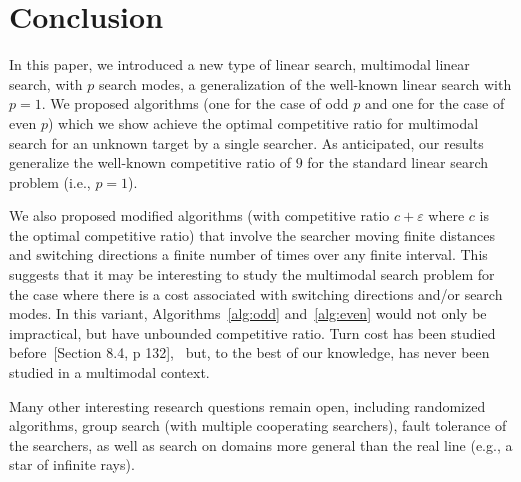 \section{Conclusion}

In this paper, we introduced a new type of linear search, multimodal linear search, with $p$ search modes, a generalization of the well-known linear search with $p=1$.
We proposed algorithms (one for the case of odd $p$ and one for the case of even $p$) which we show achieve the optimal competitive ratio for multimodal search for an unknown target by a single searcher.
As anticipated, our results generalize the well-known competitive ratio of $9$ for the standard linear search problem (i.e., $p=1$). 

We also proposed modified algorithms (with competitive ratio $c + \varepsilon$ where $c$ is the optimal competitive ratio) that involve the searcher moving finite distances and switching directions a finite number of times over any finite interval.
This suggests that it may be interesting to study the multimodal search problem for the case where there is a cost associated with switching directions and/or search modes.
In this variant, Algorithms~\ref{alg:odd} and~\ref{alg:even} would not only be impractical, but have unbounded competitive ratio.
Turn cost has been studied before~\cite{gal_search_games}[Section 8.4, p 132],~\cite{turn_cost,turn_cost_gal,lopezsearching} but, to the best of our knowledge, has never been studied in a multimodal context.

Many other interesting research questions remain open, including randomized algorithms, group search (with multiple cooperating searchers), fault tolerance of the searchers, as well as search on domains more general than the real line (e.g., a star of infinite rays). 

